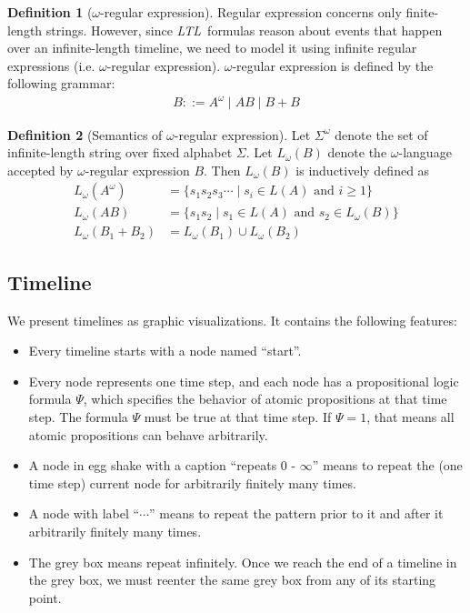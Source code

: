 \documentclass[preprint,12pt]{elsarticle}
\theoremstyle{definition}
\newtheorem{definition}{Definition}[section]
\theoremstyle{remark}
\newcommand{\ltl}{\textit{LTL}}
\begin{document}
\begin{definition}[$\omega$-regular expression]
    Regular expression concerns only finite-length strings. However, since \ltl\ formulas reason about events that happen over an infinite-length timeline, we need to model it using infinite regular expressions (i.e. $\omega$-regular expression). $\omega$-regular expression is defined by the following grammar:
    \begin{align*}
        B ::= A^{\omega} \mid AB \mid B + B
    \end{align*}
\end{definition}
\begin{definition}[Semantics of $\omega$-regular expression]\label{def:omega-semantics}
    Let $\Sigma^{\omega}$ denote the set of infinite-length string over fixed alphabet $\Sigma$. Let $L_{\omega}(B)$ denote the $\omega$-language accepted by $\omega$-regular expression $B$. Then $L_{\omega}(B)$ is inductively defined as
    \begin{align*}
        L_{\omega}(A^{\omega}) & = \{s_1s_2s_3\cdots \mid s_i \in L(A) \text{ and } i \ge 1\} \\
        L_{\omega}(AB) & = \{s_1s_2 \mid s_1 \in L(A) \text{ and } s_2 \in L_{\omega}(B)\} \\
        L_{\omega}(B_1 + B_2) &= L_{\omega}(B_1) \cup L_{\omega}(B_2)
    \end{align*}
\end{definition}

\subsection{Timeline}
We present timelines as graphic visualizations. It contains the following features:
\begin{itemize}
    \item Every timeline starts with a node named ``start''.
    \item Every node represents one time step, and each node has a propositional logic formula $\Psi$, which specifies the behavior of atomic propositions at that time step. The formula $\Psi$ must be true at that time step. If $\Psi = 1$, that means all atomic propositions can behave arbitrarily.
    \item A node in egg shake with a caption ``repeats $0$ - $\infty$'' means to repeat the (one time step) current node for arbitrarily finitely many times.
    \item A node with label ``$\cdots$'' means to repeat the pattern prior to it and after it arbitrarily finitely many times.
    \item The grey box means repeat infinitely. Once we reach the end of a timeline in the grey box, we must reenter the same grey box from any of its starting point.
\end{itemize}
\end{document}
